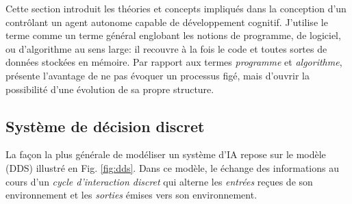 
\noindent
Cette section introduit les théories et concepts impliqués dans la conception d'un  contrôlant un agent autonome capable de développement cognitif. 
J'utilise le terme  comme un terme général englobant les notions de programme, de logiciel, ou d'algorithme au sens large: il recouvre à la fois le code et toutes sortes de données stockées en mémoire.  
Par rapport aux termes \emph{programme} et \emph{algorithme},  présente l'avantage de ne pas évoquer un processus figé, mais d'ouvrir la possibilité d'une évolution de sa propre structure.








\subsection{Système de décision discret}
\label{sec:dds}

\noindent
La façon la plus générale de modéliser un système d'IA repose sur le modèle  (DDS) illustré en Fig. \ref{fig:dds}.
Dans ce modèle, 
le  échange des informations au cours d'un \textit{cycle d'interaction discret} qui alterne les \emph{entrées} reçues de son environnement et les \emph{sorties} émises vers son environnement. 

